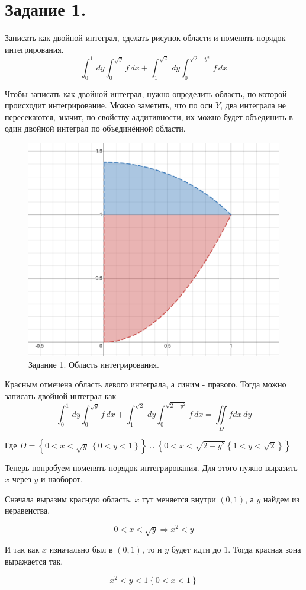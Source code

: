 \newpage

\section{Задание 1.}

Записать как двойной интеграл, сделать рисунок области и поменять порядок
интегрирования.
$$\int_{0}^{1}\, dy \int_{0}^{\sqrt{y}} f \, dx  + \int_{1}^{\sqrt{2}} \, dy\int_{0}^{\sqrt{2-y^2}} f \, dx $$

Чтобы записать как двойной интеграл, нужно определить область, по которой происходит интегрирование. Можно заметить, что по оси $Y$, два интеграла не пересекаются, значит, по свойству аддитивности, их можно будет объединить в один двойной интеграл по объединённой области.

\begin{figure}[h!t]
    \centering
    \includegraphics[width=0.3\linewidth]{Task1/Figure_shape.png}
    \caption{Задание 1. Область интегрирования.}
\end{figure}

Красным отмечена область левого интеграла, а синим - правого. Тогда можно записать двойной интеграл как
$$\int_{0}^{1}\, dy \int_{0}^{\sqrt{y}} f \, dx  + \int_{1}^{\sqrt{2}} \, dy\int_{0}^{\sqrt{2-y^2}} f \, dx = \iint\limits_D f dx\,dy $$

Где $D = \left\{0<x<\sqrt{y}\ \left\{0<y<1\right\}\right\} \cup \left\{0<x<\sqrt{2-y^{2}}\left\{1<y<\sqrt{2}\right\}\right\}$

Теперь попробуем поменять порядок интегрирования. Для этого нужно выразить $x$ через $y$ и наоборот.

Сначала выразим красную область. $x$ тут меняется внутри $(0,1)$, а $y$ найдем из неравенства.

$$0<x<\sqrt{y} \Rightarrow x^2 < y$$ 

И так как $x$ изначально был в $(0,1)$, то и $y$ будет идти до $1$. Тогда красная зона выражается так.

\begin{equation}
    x^2 < y < 1\left\{0 < x < 1\right\}
\end{equation}

